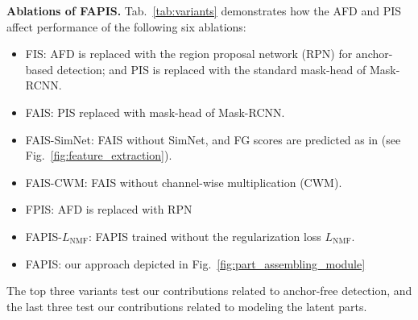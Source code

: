 \documentclass[final]{cvpr}
\def\Approach{FAPIS}
\begin{document}
{\bf Ablations of \Approach.}
Tab.~\ref{tab:variants} demonstrates how the AFD and PIS affect performance of the following six ablations: 
%
\begin{itemize}[itemsep=-2pt,topsep=-2pt, partopsep=-1pt]
    \item FIS: AFD is replaced with the region proposal network (RPN) \cite{ren2015faster} for  anchor-based detection; and PIS is replaced with the standard mask-head of Mask-RCNN.
    \item FAIS: PIS replaced with mask-head of Mask-RCNN. 
    \item FAIS-SimNet: FAIS without SimNet, and FG scores are predicted as in \cite{tian2019fcos} (see Fig.~\ref{fig:feature_extraction}).
    \item FAIS-CWM: FAIS without channel-wise multiplication (CWM).
    \item FPIS: AFD is replaced with RPN \cite{ren2015faster}
    \item FAPIS-$L_{\text{NMF}}$: FAPIS trained without the regularization loss  $L_{\text{NMF}}$.
    \item \Approach: our approach depicted in Fig.~\ref{fig:part_assembling_module}
\end{itemize}
%
The top three variants test our contributions related to anchor-free detection, and the last three test our contributions related to modeling the latent parts.
\end{document}
